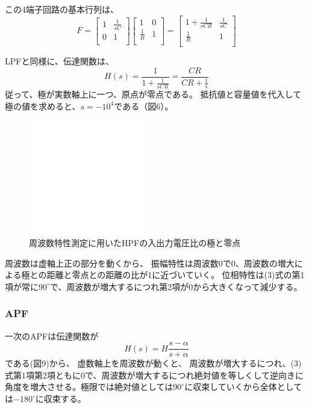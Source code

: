 \documentclass[10pt,a4j,dvipdfmx]{jsarticle}
\begin{document}
この4端子回路の基本行列は、
\begin{equation}
F =
\left[
\begin{array}{rr}
1 & \frac{1}{sC} \\
0 & 1 \\
\end{array}
\right]
\left[
\begin{array}{rr}
1 & 0 \\
\frac{1}{R} & 1 \\
\end{array}
\right]
=
\left[
\begin{array}{rr}
1+\frac{1}{sCR} & \frac{1}{sC} \\
\frac{1}{R} & 1 \\
\end{array}
\right]
\end{equation}

LPFと同様に、伝達関数は、
\begin{equation}
H\left(s\right) = \frac{1}{1+\frac{1}{sCR}} = \frac{CR}{CR+\frac{1}{s}}
\end{equation}
従って、極が実数軸上に一つ、原点が零点である。
抵抗値と容量値を代入して極の値を求めると、$s = -10^4$である（図6）。
\begin{figure}[H]
  \centering
  \includegraphics[width=5cm]{token.png}
  \caption{周波数特性測定に用いたHPFの入出力電圧比の極と零点}
\end{figure}

周波数は虚軸上正の部分を動くから、
振幅特性は周波数0で0、周波数の増大による極との距離と零点との距離の比が1に近づいていく。
位相特性は(3)式の第1項が常に$90^{\circ}$で、周波数が増大するにつれ第2項が0から大きくなって減少する。

\subsubsection{APF}
一次のAPFは伝達関数が
\begin{equation}
H\left(s\right) = H \frac{s-\alpha}{s+\alpha}
\end{equation}
である(図9)から、
虚数軸上を周波数が動くと、
周波数が増大するにつれ、(3)式第1項第2項ともに0で、周波数が増大するにつれ絶対値を等しくして逆向きに角度を増大させる。極限では絶対値としては$90^{\circ}$に収束していくから全体としては$−180^{\circ}$に収束する。
\end{document}
